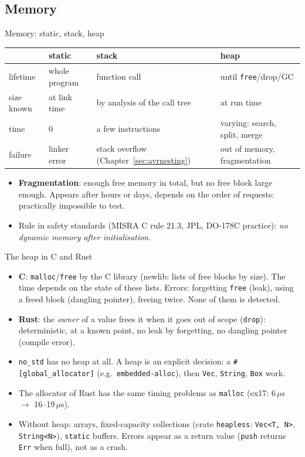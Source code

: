 \subsection{Memory}
\begin{frame}{Memory: static, stack, heap}
  \begin{center}\small
  \begin{tabular}{@{}p{}p{}p{}p{}@{}}
    \toprule
    & static & stack & heap \\
    \midrule
    lifetime & whole program & function call & until \texttt{free}/drop/GC \\
    size known & at link time & by analysis of the call tree & at run time \\
    time & 0 & a few instructions & varying: search, split, merge \\
    failure & linker error & stack overflow (Chapter~\ref{sec:avrnesting}) & out of memory, fragmentation \\
    \bottomrule
  \end{tabular}
  \end{center}
  \begin{itemize}
    \item \textbf{Fragmentation}: enough free memory in total, but no free block large enough. Appears after hours or days, depends on the order of requests: practically impossible to test.
    \item Rule in safety standards (MISRA C rule 21.3, JPL, DO-178C practice): \emph{no dynamic memory after initialisation}.
  \end{itemize}
\end{frame}

\begin{frame}{The heap in C and Rust}
  \begin{itemize}
    \item \textbf{C}: \texttt{malloc}/\texttt{free} by the C library (newlib: lists of free blocks by size). The time depends on the state of these lists. Errors: forgetting \texttt{free} (leak), using a freed block (dangling pointer), freeing twice. None of them is detected.
    \item \textbf{Rust}: the \emph{owner} of a value frees it when it goes out of scope (\texttt{drop}): deterministic, at a known point, no leak by forgetting, no dangling pointer (compile error).
    \item \texttt{no\_std} has no heap at all. A heap is an explicit decision: a \texttt{\#[global\_allocator]} (e.g.\ \texttt{embedded-alloc}), then \texttt{Vec}, \texttt{String}, \texttt{Box} work.
    \item The allocator of Rust has the same timing problems as \texttt{malloc} (ex17: 6\,$\mu$s $\rightarrow$ 16--19\,$\mu$s).
    \item Without heap: arrays, fixed-capacity collections (crate \texttt{heapless}: \texttt{Vec<T, N>}, \texttt{String<N>}), \texttt{static} buffers. Errors appear as a return value (\texttt{push} returns \texttt{Err} when full), not as a crash.
  \end{itemize}
\end{frame}

